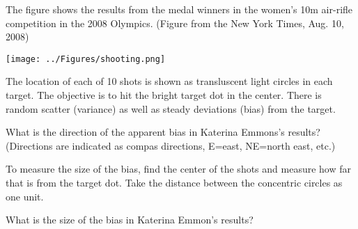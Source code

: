 

The figure shows the results from the medal winners in the
women's 10m air-rifle competition in the 2008 Olympics.  (Figure from
the New York Times, Aug. 10, 2008)

\medskip
\centerline{\texttt{[image: ../Figures/shooting.png]}}
\medskip

The location of each of 10 shots is shown as transluscent light
circles in each target.  The
objective is to hit the bright target dot in the center.  There is random
scatter (variance) as well as steady deviations (bias) from the target.



What is the direction of the apparent bias in Katerina Emmons's
results? (Directions are indicated as compas directions, E=east,
NE=north east, etc.)\\

To measure the size of the bias, find the center of the shots and
measure how far that is from the target dot.  Take the distance
between the concentric circles as one unit. 

What is the size of the bias in Katerina Emmon's results?\\
